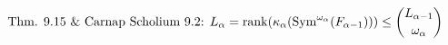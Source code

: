 \documentclass[preview]{standalone}
\begin{document}
\begin{align*}
\special{dvisvgm:raw <g id='unique000'>}\text{Thm. 9.15 \& Carnap Scholium 9.2: }L_\alpha = \operatorname{rank}(\kappa_\alpha(\operatorname{Sym}^{\omega_\alpha}(F_{\alpha-1}))) \le \binom{L_{\alpha-1}}{\omega_\alpha}\special{dvisvgm:raw </g>}
\end{align*}
\end{document}
